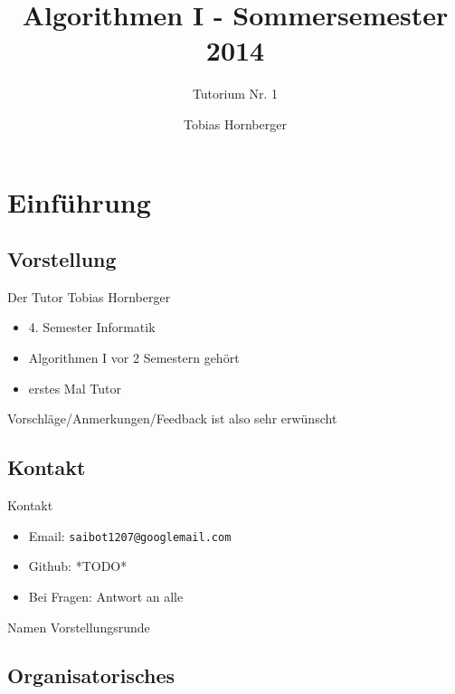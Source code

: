 \documentclass[18pt]{beamer}
\title[Algo Tutorium Nr.1]{Algorithmen I - Sommersemester 2014}
\subtitle{Tutorium Nr. 1}
\author{Tobias Hornberger}
\institute{Institut für Theoretische Informatik}
\begin{document}

\begin{frame}
\titlepage
\end{frame}


\section{Einführung}
	\subsection{Vorstellung}
	\begin{frame}{Der Tutor}
		Tobias Hornberger
		\begin{itemize}
			\item 4. Semester Informatik
			\item Algorithmen I vor 2 Semestern gehört
			\item erstes Mal Tutor
		\end{itemize}
		Vorschläge/Anmerkungen/Feedback ist also sehr erwünscht
	\end{frame}

	\subsection{Kontakt}
	\begin{frame}{Kontakt}
		
		\begin{itemize}
			\item Email: \texttt{saibot1207@googlemail.com}
			\item Github: *TODO*
			\item Bei Fragen: Antwort an alle
		\end{itemize}
	\end{frame}
	
	\begin{frame}{Namen}
		Vorstellungsrunde		
	\end{frame}

	\subsection{Organisatorisches}
\end{document}
